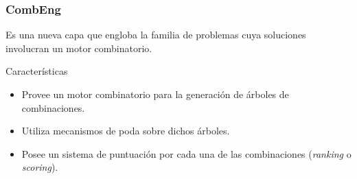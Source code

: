 \begin{frame}\frametitle{CombEng}
        Es una nueva capa  que engloba la familia de problemas cuya soluciones involucran un motor combinatorio.

        \begin{block}{Características}
            \begin{itemize}
                \item Provee un motor combinatorio para la generación de árboles de combinaciones.
                \item Utiliza mecanismos de poda sobre dichos árboles.
                \item Posee un sistema de puntuación por cada una de las combinaciones (\textit{ranking} o \textit{scoring}).
            \end{itemize}         
        \end{block}
         
\end{frame}


